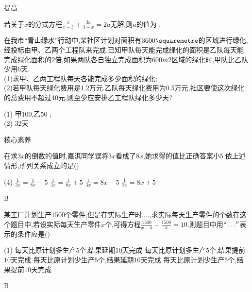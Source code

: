 \documentclass[cn,blue,12pt]{elegantbook}
\renewcommand \tkt[1]{{\CJKunderline[hidden=true, skip=true, thickness=1pt]{#1}}}
\begin{document}
\begin{shiti}
\begin{shiti}
    \end{shiti}
\item 提高
    \begin{shiti}[resume]
    \item 若关于\(x\)的分式方程\(\frac{x}{x-3}+\frac{3a}{3-x}=2a\)无解,则\(a\)的值为\tkt{\(1\text{或}\frac{1}{2}\)} .
    \item 在我市``青山绿水''行动中,某社区计划对面积有\(3600 \squaremetre \)的区域进行绿化,经投标由甲、乙两个工程队来完成.已知甲队每天能完成绿化的面积是乙队每天能完成绿化面积的\(2\)倍,如果两队各自独立完成面积为\(600 m2\)区域的绿化时,甲队比乙队少用\(6\)天.\\
        (1)求甲、乙两工程队每天各能完成多少面积的绿化;\\
        (2)若甲队每天绿化费用是1.2万元.乙队每天绿化费用为0.5万元,社区要使这次绿化的总费用不超过40元,则至少应安排乙工程队绿化多少天?
\begin{solution}
            (1) 甲100,乙50 ;\\
            (2) 32天
\end{solution}
    \end{shiti}
\item 核心素养
    \begin{shiti}
    \item 在求\(3x\)的倒数的值时,嘉淇同学误将\(3x\)看成了\(8x\),她求得的值比正确答案小5.依上述情形,所列关系成立的是(\qquad)\\
    \begin{tasks}(4)
    \task \(\frac{1}{3x}=\frac{1}{8x}-5\)
    \task \(\frac{1}{3x}=\frac{1}{8x}+5\)
    \task \(\frac{1}{3x}=8x-5\)
    \task \(\frac{1}{3x}=8x+5\)
    \end{tasks}
\begin{solution}
        B
\end{solution}
    \item 某工厂计划生产\(1500\)个零件,但是在实际生产时,\(  \dots \),求实际每天生产零件的个数在这个题目中,若设实际每天生产零件\(x\)个,可得方程\(\frac{1500}{x-5}-\frac{1500}{x}=10\).则题目中用\(`` \dots '' \)表示的条件应是(\qquad)\\
    \begin{tasks}(1)
        \task 每天比原计划多生产\(5\)个,结果延期\(10\)天完成
        \task 每天比原计划多生产\(5\)个,结果提前\(10\)天完成
        \task 每天比原计划少生产\(5\)个,结果延期\(10\)天完成
        \task 每天比原计划少生产\(5\)个,结果提前\(10\)天完成
    \end{tasks}
\begin{solution}
        B
\end{solution}
    \end{shiti}
\end{shiti}
\end{document}
